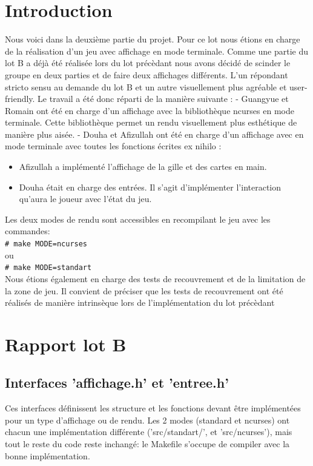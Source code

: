 \documentclass[10pt]{article}
\newcommand{\shellcmd}[1]{\\\indent\indent\texttt{\footnotesize\# #1}\\}
\begin{document}
  \section{Introduction}
    Nous voici dans la deuxième partie du projet. Pour ce lot nous étions en charge de la réalisation d'un jeu avec affichage en mode terminale. Comme une partie du lot B a déjà été réalisée lors du lot précèdant nous avons décidé de scinder le groupe en deux parties et de faire deux affichages différents. 
    L'un répondant stricto sensu au demande du lot B et un autre visuellement plus agréable et user-friendly.
    Le travail a été donc réparti de la manière suivante :
    \newline
      - Guangyue et Romain ont été en charge d'un affichage avec la bibliothèque ncurses en mode terminale.
      Cette bibliothèque permet un rendu visuellement plus esthétique de manière plus aisée.
      \newline
      - Douha et Afizullah ont été en charge d'un affichage avec en mode terminale avec toutes les fonctions écrites ex nihilo :
	\begin{itemize}[label=-]
	  \item Afizullah a implémenté l'affichage de la gille et des cartes en main.
	  \item Douha était en charge des entrées. Il s'agit d'implémenter l'interaction qu'aura le joueur avec l'état du jeu.
	\end{itemize}
    Les deux modes de rendu sont accessibles en recompilant le jeu avec les commandes:
    \newline
    \shellcmd{make MODE=ncurses} ou \shellcmd{make MODE=standart}\newline
    Nous étions également en charge des tests de recouvrement et de la limitation de la zone de jeu. 
    Il convient de préciser que les tests de recouvrement ont été réalisés de manière intrinsèque lors de l'implémentation du lot précèdant
  \newpage
  \section{Rapport lot B}
  \subsection{Interfaces 'affichage.h' et 'entree.h'}
      Ces interfaces définissent les structure et les fonctions devant être implémentées pour un type d'affichage ou de rendu.
      Les 2 modes (standard et ncurses) ont chacun une implémentation différente ('src/standart/', et 'src/ncurses'),
      mais tout le reste du code reste inchangé: le Makefile s'occupe de compiler avec la bonne implémentation.
      
\end{document}
